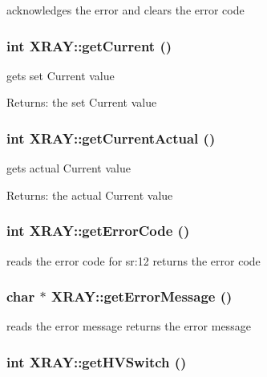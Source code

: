 acknowledges the error and clears the error code 
\subsubsection{\setlength{\rightskip}{0pt plus 5cm}int XRAY::get\-Current ()}\label{classXRAY_c4da3bcc51dbced1ed03fde371254065}


gets set Current value \begin{Desc}
\item[Returns:]the set Current value \end{Desc}
\subsubsection{\setlength{\rightskip}{0pt plus 5cm}int XRAY::get\-Current\-Actual ()}\label{classXRAY_cd9b999b021ab1b14f7e50f8b69484a8}


gets actual Current value \begin{Desc}
\item[Returns:]the actual Current value \end{Desc}
\subsubsection{\setlength{\rightskip}{0pt plus 5cm}int XRAY::get\-Error\-Code ()}\label{classXRAY_a381062ddaed811c1e7e2e153307c93c}


reads the error code for sr:12 returns the error code 
\subsubsection{\setlength{\rightskip}{0pt plus 5cm}char $\ast$ XRAY::get\-Error\-Message ()}\label{classXRAY_2de8cb7fd9380718814d9d7c9d07630e}


reads the error message returns the error message 
\subsubsection{\setlength{\rightskip}{0pt plus 5cm}int XRAY::get\-HVSwitch ()}\label{classXRAY_4d495eda32c84d18508ac596b6b4e029}


